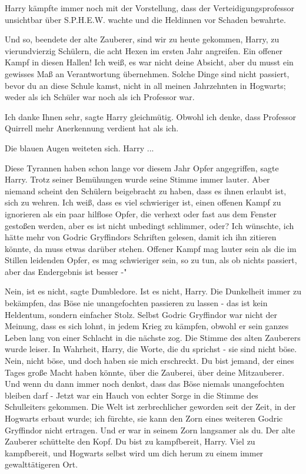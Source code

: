 Harry kämpfte immer noch mit der Vorstellung, dass der Verteidigungsprofessor
unsichtbar über S.P.H.E.W. wachte und die Heldinnen vor Schaden bewahrte.

\glqq{}Und so\grqq{}, beendete der alte Zauberer, \glqq{}sind wir zu heute
gekommen, Harry, zu vierundvierzig Schülern, die acht Hexen im ersten Jahr
angreifen. Ein offener Kampf in diesen Hallen! Ich weiß, es war nicht deine
Absicht, aber du musst ein gewisses Maß an Verantwortung übernehmen. Solche
Dinge sind nicht passiert, bevor du an diese Schule kamst, nicht in all meinen
Jahrzehnten in Hogwarts; weder als ich Schüler war noch als ich Professor
war.\grqq{}

\glqq{}Ich danke Ihnen sehr\grqq{}, sagte Harry gleichmütig. \glqq{}Obwohl ich
denke, dass Professor Quirrell mehr Anerkennung verdient hat als ich.\grqq{}

Die blauen Augen weiteten sich. \glqq{}Harry ...\grqq{}

\glqq{}Diese Tyrannen haben schon lange vor diesem Jahr Opfer angegriffen\grqq{},
sagte Harry. Trotz seiner Bemühungen wurde seine Stimme immer lauter. \glqq{}Aber
niemand scheint den Schülern beigebracht zu haben, dass es ihnen erlaubt ist,
sich zu wehren. Ich weiß, dass es viel schwieriger ist, einen offenen Kampf zu
ignorieren als ein paar hilflose Opfer, die verhext oder fast aus dem Fenster
gestoßen werden, aber es ist nicht unbedingt schlimmer, oder? Ich wünschte, ich
hätte mehr von Godric Gryffindors Schriften gelesen, damit ich ihn zitieren
könnte, da muss etwas darüber stehen. Offener Kampf mag lauter sein als die im
Stillen leidenden Opfer, es mag schwieriger sein, so zu tun, als ob nichts
passiert, aber das Endergebnis ist besser -"

\glqq{}Nein, ist es nicht\grqq{}, sagte Dumbledore. \glqq{}Ist es nicht, Harry.
Die Dunkelheit immer zu bekämpfen, das Böse nie unangefochten passieren zu
lassen - das ist kein Heldentum, sondern einfacher Stolz. Selbst Godric
Gryffindor war nicht der Meinung, dass es sich lohnt, in jedem Krieg zu kämpfen,
obwohl er sein ganzes Leben lang von einer Schlacht in die nächste zog.\grqq{}
Die Stimme des alten Zauberers wurde leiser. \glqq{}In Wahrheit, Harry, die
Worte, die du sprichst - sie sind nicht böse. Nein, nicht böse, und doch haben
sie mich erschreckt. Du bist jemand, der eines Tages große Macht haben könnte,
über die Zauberei, über deine Mitzauberer. Und wenn du dann immer noch denkst,
dass das Böse niemals unangefochten bleiben darf -\grqq{} Jetzt war ein Hauch
von echter Sorge in die Stimme des Schulleiters gekommen. \glqq{}Die Welt ist
zerbrechlicher geworden seit der Zeit, in der Hogwarts erbaut wurde; ich
fürchte, sie kann den Zorn eines weiteren Godric Gryffindor nicht ertragen. Und
er war in seinem Zorn langsamer als du.\grqq{} Der alte Zauberer schüttelte den
Kopf. \glqq{}Du bist zu kampfbereit, Harry. Viel zu kampfbereit, und Hogwarts
selbst wird um dich herum zu einem immer gewalttätigeren Ort.\grqq{}

